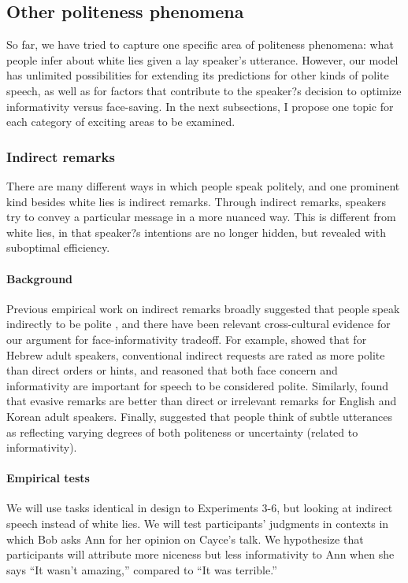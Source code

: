 \subsection{Other politeness phenomena}
\label{sec:other}

So far, we have tried to capture one specific area of politeness phenomena: what people infer about white lies given a lay speaker's utterance. However, our model has unlimited possibilities for extending its predictions for other kinds of polite speech, as well as for factors that contribute to the speaker?s decision to optimize informativity versus face-saving. In the next subsections, I propose one topic for each category of exciting areas to be examined. 

\subsubsection{Indirect remarks}

There are many different ways in which people speak politely, and one prominent kind besides white lies is indirect remarks. Through indirect remarks, speakers try to convey a particular message in a more nuanced way. This is different from white lies, in that speaker?s intentions are no longer hidden, but revealed with suboptimal efficiency. 

\paragraph{Background} Previous empirical work on indirect remarks broadly suggested that people speak indirectly to be polite \citep{clark1980}, and there have been relevant cross-cultural evidence for our argument for face-informativity tradeoff. For example, \citet{blumkulka1987} showed that for Hebrew adult speakers, conventional indirect requests are rated as more polite than direct orders or hints, and reasoned that both face concern and informativity are important for speech to be considered polite. Similarly, \citet{holtgraves1990} found that evasive remarks are better than direct or irrelevant remarks for English and Korean adult speakers. Finally, \citet{holtgraves2016} suggested that people think of subtle utterances as reflecting varying degrees of both politeness or uncertainty (related to informativity). 

\paragraph{Empirical tests} We will use tasks identical in design to Experiments 3-6, but looking at indirect speech instead of white lies. We will test participants' judgments in contexts in which Bob asks Ann for her opinion on Cayce's talk. We hypothesize that participants will attribute more niceness but less informativity to Ann when she says ``It wasn't amazing,'' compared to ``It was terrible.''

